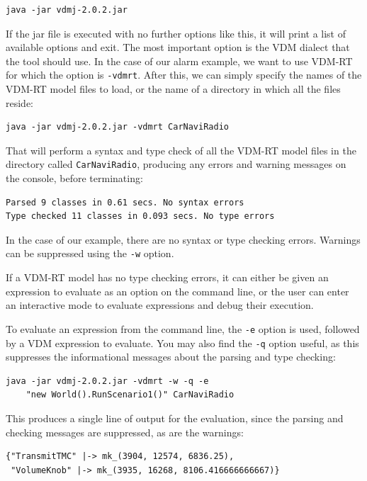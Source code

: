 \lstset{style=tool,language=}
\begin{lstlisting}
java -jar vdmj-2.0.2.jar
\end{lstlisting}

\noindent If the jar file is executed with no further options like this, it will
print a list of available options and exit. The most important option is the VDM
dialect that the tool should use. In the case of our alarm example, we want to
use VDM-RT for which the option is \verb|-vdmrt|. After this, we can simply
specify the names of the VDM-RT model files to load, or the name of a directory
in which all the files reside:

\begin{lstlisting}
java -jar vdmj-2.0.2.jar -vdmrt CarNaviRadio
\end{lstlisting}

\noindent That will perform a syntax and type check of all the VDM-RT model
files in the directory called \verb|CarNaviRadio|, producing any errors and warning
messages on the console, before terminating:

\begin{lstlisting}
Parsed 9 classes in 0.61 secs. No syntax errors
Type checked 11 classes in 0.093 secs. No type errors
\end{lstlisting}

\noindent In the case of our example, there are no syntax or type checking
errors. Warnings can be suppressed using the \verb|-w| option.

If a VDM-RT model has no type checking errors, it can either be given an
expression to evaluate as an option on the command line, or the user can enter
an interactive mode to evaluate expressions and debug their execution.

To evaluate an expression from the command line, the \verb|-e| option is used,
followed by a VDM expression to evaluate. You may also find the \verb|-q|
option useful, as this suppresses the informational messages about the parsing
and type checking:

\begin{lstlisting}
java -jar vdmj-2.0.2.jar -vdmrt -w -q -e 
    "new World().RunScenario1()" CarNaviRadio
\end{lstlisting}

\noindent This produces a single line of output for the evaluation, since the
parsing and checking messages are suppressed, as are the warnings:

\begin{lstlisting}
{"TransmitTMC" |-> mk_(3904, 12574, 6836.25),
 "VolumeKnob" |-> mk_(3935, 16268, 8106.416666666667)}
\end{lstlisting}

